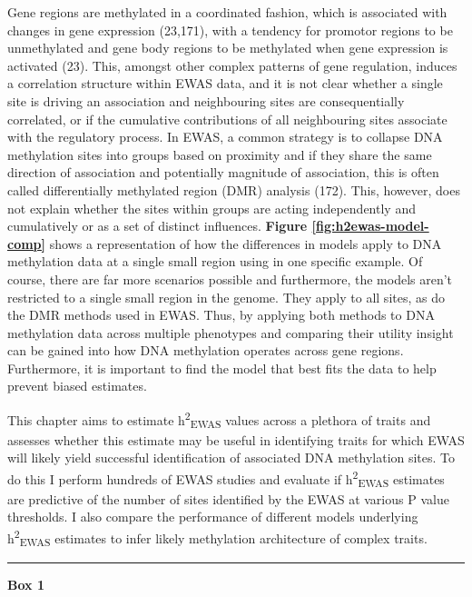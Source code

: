 \documentclass[11pt,oneside]{bristolthesis}
\begin{document}
Gene regions are methylated in a coordinated fashion, which is associated with changes in gene expression (23,171), with a tendency for promotor regions to be unmethylated and gene body regions to be methylated when gene expression is activated (23). This, amongst other complex patterns of gene regulation, induces a correlation structure within EWAS data, and it is not clear whether a single site is driving an association and neighbouring sites are consequentially correlated, or if the cumulative contributions of all neighbouring sites associate with the regulatory process. In EWAS, a common strategy is to collapse DNA methylation sites into groups based on proximity and if they share the same direction of association and potentially magnitude of association, this is often called differentially methylated region (DMR) analysis (172). This, however, does not explain whether the sites within groups are acting independently and cumulatively or as a set of distinct influences. \textbf{Figure \ref{fig:h2ewas-model-comp}} shows a representation of how the differences in models apply to DNA methylation data at a single small region using in one specific example. Of course, there are far more scenarios possible and furthermore, the models aren't restricted to a single small region in the genome. They apply to all sites, as do the DMR methods used in EWAS. Thus, by applying both methods to DNA methylation data across multiple phenotypes and comparing their utility insight can be gained into how DNA methylation operates across gene regions. Furthermore, it is important to find the model that best fits the data to help prevent biased estimates.

This chapter aims to estimate h\textsuperscript{2}\textsubscript{EWAS} values across a plethora of traits and assesses whether this estimate may be useful in identifying traits for which EWAS will likely yield successful identification of associated DNA methylation sites. To do this I perform hundreds of EWAS studies and evaluate if h\textsuperscript{2}\textsubscript{EWAS} estimates are predictive of the number of sites identified by the EWAS at various P value thresholds. I also compare the performance of different models underlying h\textsuperscript{2}\textsubscript{EWAS} estimates to infer likely methylation architecture of complex traits.
\begin{center}\rule{0.5\linewidth}{0.5pt}\end{center}

\textbf{Box 1}
\end{document}
